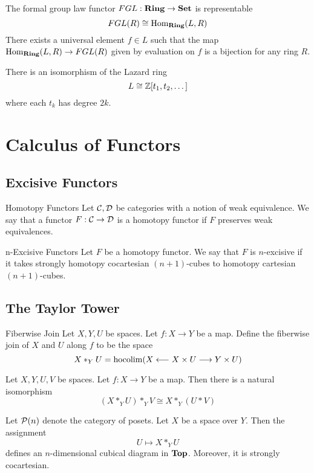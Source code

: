 \documentclass[a4paper]{article}
\begin{document}
\begin{thm}{}{} The formal group law functor $FGL:\bold{Ring}\to\bold{Set}$ is representable $$FGL(R)\cong\operatorname{Hom}_\bold{Ring}(L,R)$$ There exists a universal element $f\in L$ such that the map $\operatorname{Hom}_\bold{Ring}(L,R)\to FGL(R)$ given by evaluation on $f$ is a bijection for any ring $R$. 
\end{thm}

\begin{thm}{}{} There is an isomorphism of the Lazard ring $$L\cong\mathbb{Z}[t_1,t_2,\dots]$$ where each $t_k$ has degree $2k$. 
\end{thm}


\pagebreak
\section{Calculus of Functors}
\subsection{Excisive Functors}
\begin{defn}{Homotopy Functors}{} Let $\mathcal{C},\mathcal{D}$ be categories with a notion of weak equivalence. We say that a functor $F:\mathcal{C}\to\mathcal{D}$ is a homotopy functor if $F$ preserves weak equivalences. 
\end{defn}

\begin{defn}{n-Excisive Functors}{} Let $F$ be a homotopy functor. We say that $F$ is $n$-excisive if it takes strongly homotopy cocartesian $(n+1)$-cubes to homotopy cartesian $(n+1)$-cubes. 
\end{defn}

\subsection{The Taylor Tower}
\begin{defn}{Fiberwise Join}{} Let $X,Y,U$ be spaces. Let $f:X\to Y$ be a map. Define the fiberwise join of $X$ and $U$ along $f$ to be the space $$X\ast_YU=\operatorname*{hocolim}(X\longleftarrow X\times U\longrightarrow Y\times U)$$
\end{defn}

\begin{lmm}{}{} Let $X,Y,U,V$ be spaces. Let $f:X\to Y$ be a map. Then there is a natural isomorphism $$(X\ast_YU)\ast_YV\cong X\ast_Y(U\ast V)$$
\end{lmm}

\begin{prp}{}{} Let $\mathcal{P}(n)$ denote the category of posets. Let $X$ be a space over $Y$. Then the assignment $$U\mapsto X\ast_YU$$ defines an $n$-dimensional cubical diagram in $\bold{Top}$. Moreover, it is strongly cocartesian. 
\end{prp}
\end{document}
